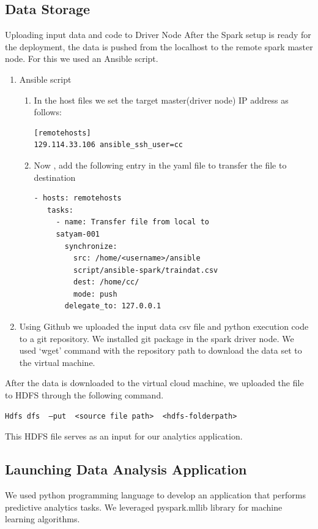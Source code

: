 \documentclass[9pt,twocolumn,twoside]{../../styles/osajnl}
\begin{document}
\subsection{Data Storage}
 Uploading input data and code to Driver Node After the Spark setup is ready for the deployment, the data is pushed from the localhost to the remote spark master node. For this we used an Ansible script.
\begin{enumerate}
 \item Ansible script
\begin{enumerate}
 \item In the host files we set the target master(driver node) IP address as follows:
 \begin{verbatim}
[remotehosts]
129.114.33.106 ansible_ssh_user=cc
\end{verbatim}
\item  Now , add the following entry in the yaml file to transfer the file to destination
\begin{verbatim}
- hosts: remotehosts
   tasks:
     - name: Transfer file from local to
     satyam-001
       synchronize:
         src: /home/<username>/ansible
         script/ansible-spark/traindat.csv
         dest: /home/cc/
         mode: push
       delegate_to: 127.0.0.1
\end{verbatim}
\end{enumerate}
\item Using Github we uploaded the input data csv file and python execution code to a git repository. We installed git package in the spark driver node. We used ‘wget’ command  with the repository path to download  the data set to the virtual machine.
\end{enumerate}

 
After the data is downloaded to the virtual cloud machine, we uploaded the file to HDFS through the following command.
\begin{verbatim}
Hdfs dfs  –put  <source file path>  <hdfs-folderpath>
\end{verbatim}

This HDFS file serves as an input for our analytics application.

\subsection{Launching Data Analysis Application}
 We used  python programming language to develop an application that  performs predictive analytics tasks. We leveraged  pyspark.mllib library for machine learning algorithms.
 
\end{document}
